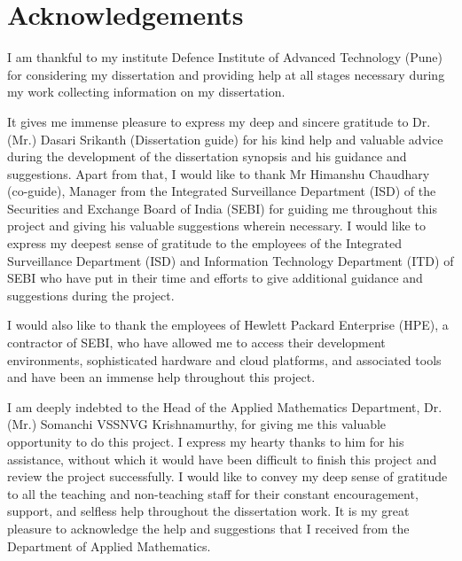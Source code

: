 \chapter*{Acknowledgements}

I am thankful to my institute Defence Institute of Advanced Technology (Pune) for considering my dissertation and providing help at all stages necessary during my work collecting information on my dissertation. \par

It gives me immense pleasure to express my deep and sincere gratitude to Dr.(Mr.) Dasari Srikanth (Dissertation guide) for his kind help and valuable advice during the development of the dissertation synopsis and his guidance and suggestions.
Apart from that, I would like to thank Mr Himanshu Chaudhary (co-guide), Manager from the Integrated Surveillance Department (ISD) of the Securities and Exchange Board of India (SEBI) for guiding me throughout this project and giving his valuable suggestions wherein necessary. I would like to express my deepest sense of gratitude to the employees of the Integrated Surveillance Department (ISD) and Information Technology Department (ITD) of SEBI who have put in their time and efforts to give additional guidance and suggestions during the project. \par
I would also like to thank the employees of Hewlett Packard Enterprise (HPE), a contractor of SEBI, who have allowed me to access their development environments, sophisticated hardware and cloud platforms, and associated tools and have been an immense help throughout this project. \par
I am deeply indebted to the Head of the Applied Mathematics Department, Dr. (Mr.) Somanchi VSSNVG Krishnamurthy, for giving me this valuable opportunity to do this project. I express my hearty thanks to him for his assistance, without which it would have been difficult to finish this project and review the project successfully.
I would like to convey my deep sense of gratitude to all the teaching and non-teaching staff for their constant encouragement, support, and selfless help throughout the dissertation work. It is my great pleasure to acknowledge the help and suggestions that I received from the Department of Applied Mathematics.
